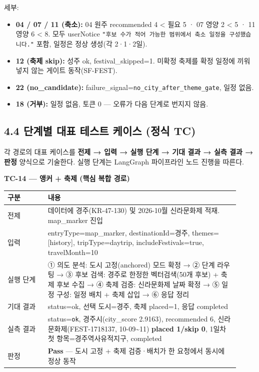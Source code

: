 \documentclass[11pt,a4paper]{article}
\newcommand{\DocNeedspace}[1]{\par\ifdim\dimexpr\pagegoal-\pagetotal\relax<#1\newpage\fi}
\providecommand{\tightlist}{\setlength{\itemsep}{0pt}\setlength{\parskip}{0pt}}
\begin{document}
세부:

\begin{itemize}
\tightlist
\item
  \textbf{04 / 07 / 11 (축소):} 04 원주 recommended 4 \textless{} 필요 5 · 07 영양 2 \textless{} 5 · 11 영양 6 \textless{} 8. 모두 userNotice \texttt{"후보\ 수가\ 적어\ 가능한\ 범위에서\ 축소\ 일정을\ 구성했습니다.\allowbreak{}"} 포함, 일정은 정상 생성(각 2·1·2일).
\item
  \textbf{12 (축제 skip):} 성주 ok, festival\_skipped=1. 미확정 축제를 확정 일정에 끼워넣지 않는 게이트 동작(SF-FEST).
\item
  \textbf{22 (no\_candidate):} failure\_signal=\texttt{no\_\allowbreak{}city\_\allowbreak{}after\_\allowbreak{}theme\_\allowbreak{}gate}, 일정 없음.
\item
  \textbf{18 (거부):} 일정 없음, 토큰 0 --- 오류가 다음 단계로 번지지 않음.
\end{itemize}

\DocNeedspace{6\baselineskip}
\subsection*{4.4 단계별 대표 테스트 케이스 (정식 TC)}

각 경로의 대표 케이스를 \textbf{전제 → 입력 → 실행 단계 → 기대 결과 → 실측 결과 → 판정} 양식으로 기술한다. 실행 단계는 LangGraph 파이프라인 노드 진행을 따른다.

\textbf{TC-14 --- 앵커 + 축제 (핵심 복합 경로)}

\begin{small}
\begin{longtable}{@{}>{\RaggedRight\arraybackslash}m{0.160\linewidth}>{\RaggedRight\arraybackslash}m{0.760\linewidth}@{}}
\toprule\noalign{}
구분 & 내용 \\
\midrule\noalign{}
\endhead
\bottomrule\noalign{}
\endlastfoot
전제 & 데이터에 경주(KR-47-130) 및 2026-10월 신라문화제 적재. map\_marker 진입 \\
입력 & entryType=map\_marker, destinationId=경주, themes={[}history{]}, tripType=daytrip, includeFestivals=true, travelMonth=10 \\
실행 단계 & ① 의도 분석: 도시 고정(anchored) 모드 확정 → ② 단계 라우팅 → ③ 후보 검색: 경주로 한정한 벡터검색(50개 후보) + 축제 후보 수집 → ④ 축제 검증: 신라문화제 날짜 확정 → ⑤ 일정 구성: 일정 배치 + 축제 삽입 → ⑥ 응답 정리 \\
기대 결과 & status=ok, 선택 도시=경주, 축제 placed=1, 응답 completed \\
실측 결과 & status=\texttt{ok}, 경주시(city\_score 2.9163), recommended 6, 신라문화제(FEST-1718137, 10-09\textasciitilde11) \textbf{placed 1/skip 0}, 1일차 첫 항목=경주역사유적지구, completed \\
판정 & \textbf{Pass} --- 도시 고정 + 축제 검증·배치가 한 요청에서 동시에 정상 동작 \\
\end{longtable}
\end{small}
\end{document}
